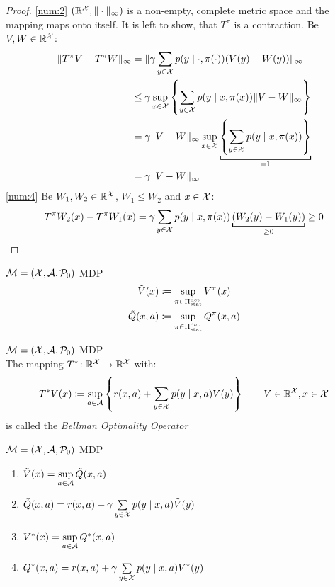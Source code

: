 \begin{proof}
\ref{num:2} \((\mathbb{R}^{\mathcal{X}}, \|\cdot\|_\infty)\) is a non-empty, complete metric space and the mapping maps onto itself. It is left to show, that \(T^\pi\) is a contraction. Be \(V,W\in\mathbb{R}^{\mathcal{X}}\):
\begin{align*}
	\|T^\pi V -T^\pi W\|_\infty &=\|\gamma\sum_{y\in\cX} p(y\mid \cdot,\pi(\cdot)) (V(y)-W(y))\|_\infty\\
	&\le\gamma \sup_{x\in\cX}\left\{ \sum_{y\in\cX} p(y\mid x,\pi(x)) \|V-W\|_\infty \right\}\\
	&=\gamma \|V-W\|_\infty  \sup_{x\in\cX}\underbracket{\left\{ \sum_{y\in\cX} p(y\mid x,\pi(x)) \right\}}_{=1}\\
	&=\gamma \|V-W\|_\infty 
\end{align*}
\ref{num:4} Be \(W_1,W_2\in\mathbb{R}^{\mathcal{X}}\), \(W_1\le W_2\) and \(x\in\mathcal{X}\):
\begin{align*}
	T^\pi W_2 (x) - T^\pi W_1(x) 
	= \gamma \sum_{y\in\cX} p(y\mid x,\pi(x)) \underbracket{(W_2(y)-W_1(y))}_{\ge 0} 
	\ge 0
\end{align*}
\end{proof}


\begin{definition}\(\mathcal{M}=(\mathcal{X},\mathcal{A},\mathcal{P}_0)\) MDP
\begin{align*}
	\tilde{V}(x)&\coloneqq \sup_{\pi\in\Pi_{\textnormal{stat}}^{\textnormal{det}}} V^\pi(x)\\
	\tilde{Q}(x,a)&\coloneqq\sup_{\pi\in\Pi_{\textnormal{stat}}^{\textnormal{det}}}Q^\pi(x,a)
\end{align*}
\end{definition}


\begin{definition}\(\mathcal{M}=(\mathcal{X},\mathcal{A},\mathcal{P}_0)\) MDP\\
The mapping \(T^*\colon\mathbb{R}^{\mathcal{X}}\to\mathbb{R}^{\mathcal{X}}\) with:
	\[
	 T^* V(x)\coloneqq \sup_{a\in\mathcal{A}}\left\{r(x,a)+\sum_{y\in\mathcal{X}}p(y\mid x,a) V(y)\right\} \qquad V\in\mathbb{R}^{\mathcal{X}}, x\in\mathcal{X}
	\]
is called the \emph{Bellman Optimality Operator}
\end{definition}


\begin{lemma}\label{V*,Q* relation}\(\mathcal{M}=(\mathcal{X},\mathcal{A},\mathcal{P}_0)\) MDP
\begin{enumerate}[label=\textbf{(\roman*)},font=\normalfont]
\item\label{i:1} \(\tilde{V}(x)=\sup\limits_{a\in\mathcal{A}} \tilde{Q}(x,a)\)
\item\label{i:2} \( \tilde{Q}(x,a) = r(x,a)+\gamma\sum\limits_{y\in\mathcal{X}}p(y\mid x,a)\tilde{V}(y) \)
\item\label{i:3} \(V^*(x)=\sup\limits_{a\in\mathcal{A}}Q^*(x,a)\)
\item\label{i:4} \(Q^*(x,a)=r(x,a)+\gamma \sum\limits_{y\in\mathcal{X}}p(y\mid x,a) V^*(y)\)
\end{enumerate}
\end{lemma}

